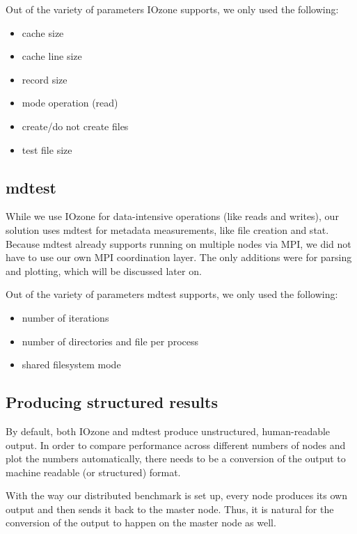 Out of the variety of parameters IOzone supports, we only used the following:

\begin{itemize}

\item cache size
\item cache line size
\item record size
\item mode operation (read)
\item create/do not create files
\item test file size

\end{itemize}



\subsection{mdtest}

While we use IOzone for data-intensive operations (like reads and writes), our solution uses mdtest for metadata measurements, like file creation and stat. Because mdtest already supports running on multiple nodes via MPI, we did not have to use our own MPI coordination layer. The only additions were for parsing and plotting, which will be discussed later on.

Out of the variety of parameters mdtest supports, we only used the following:

\begin{itemize}

\item number of iterations
\item number of directories and file per process
\item shared filesystem mode

\end{itemize}




\subsection{Producing structured results}

By default, both IOzone and mdtest produce unstructured, human-readable output. In order to compare performance across different numbers of nodes and plot the numbers automatically, there needs to be a conversion of the output to machine readable (or structured) format.

With the way our distributed benchmark is set up, every node produces its own output and then sends it back to the master node. Thus, it is natural for the conversion of the output to happen on the master node as well.


